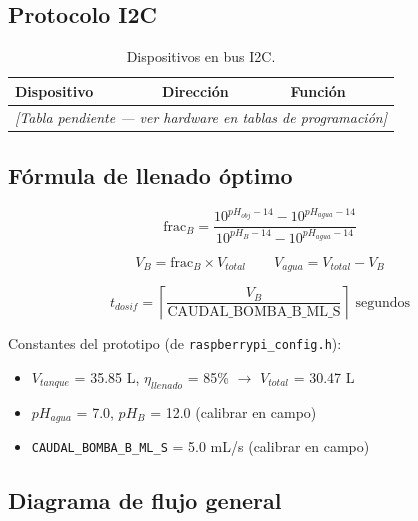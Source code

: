 \documentclass[11pt,tesis,twoside,openright,spanish]{upiiztt}
\begin{document}
\subsection{Protocolo I2C}

\begin{table}[H]
  \centering
  \caption{Dispositivos en bus I2C.}
  \label{tab:i2c}
  \begin{tabular}{lll}
    \toprule
    \textbf{Dispositivo} & \textbf{Dirección} & \textbf{Función} \\
    \midrule
    \multicolumn{3}{c}{\textit{[Tabla pendiente — ver hardware en tablas de programación]}} \\
    \bottomrule
  \end{tabular}
\end{table}

\subsection{Fórmula de llenado óptimo}

\begin{equation}
    \text{frac}_B = \frac{10^{pH_{obj}-14} - 10^{pH_{agua}-14}}{10^{pH_B-14} - 10^{pH_{agua}-14}}
\end{equation}

\begin{equation}
    V_B = \text{frac}_B \times V_{total} \qquad V_{agua} = V_{total} - V_B
\end{equation}

\begin{equation}
    t_{dosif} = \left\lceil \frac{V_B}{\text{CAUDAL\_BOMBA\_B\_ML\_S}} \right\rceil \text{ segundos}
\end{equation}

\noindent Constantes del prototipo (de \texttt{raspberrypi\_config.h}):
\begin{itemize}
    \item $V_{tanque}$ = 35.85 L, $\eta_{llenado}$ = 85\% $\rightarrow$ $V_{total}$ = 30.47 L
    \item $pH_{agua}$ = 7.0, $pH_B$ = 12.0 (calibrar en campo)
    \item \texttt{CAUDAL\_BOMBA\_B\_ML\_S} = 5.0 mL/s (calibrar en campo)
\end{itemize}

\subsection{Diagrama de flujo general}
\end{document}

